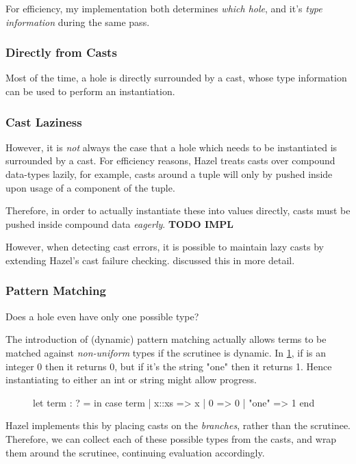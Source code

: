 For efficiency, my implementation both determines \textit{which hole}, and it's \textit{type information} during the same pass.

\subsubsection{Directly from Casts}
Most of the time, a hole is directly surrounded by a cast, whose type information can be used to perform an instantiation.

\subsubsection{Cast Laziness}\label{sec:CastLaziness}
However, it is \textit{not} always the case that a hole which needs to be instantiated is surrounded by a cast. For efficiency reasons, Hazel treats casts over compound data-types lazily, for example, casts around a tuple will only by pushed inside upon usage of a component of the tuple.

Therefore, in order to actually instantiate these into values directly, casts must be pushed inside compound data \textit{eagerly}. \textbf{TODO IMPL}

However, when detecting cast errors, it is possible to maintain lazy casts by extending Hazel's cast failure checking.  discussed this in more detail.


\subsubsection{Pattern Matching}
\label{sec:PatternMatching}
Does a hole even have only one possible type?

The introduction of (dynamic) pattern matching actually allows terms to be matched against \textit{non-uniform} types if the scrutinee is dynamic. In \cref{fig:DynamicPatternMatching}, if  is an integer 0 then it returns 0, but if it's the string "one" then it returns 1. Hence instantiating  to either an int or string might allow progress.

\begin{figure}[h]
let term : ? =   in
case term 
  | x::xs => x
  | 0 => 0
| "one" => 1 end 
\label{fig:DynamicPatternMatching}
\end{figure}

Hazel implements this by placing casts on the \textit{branches}, rather than the scrutinee. Therefore, we can collect each of these possible types from the casts, and wrap them around the scrutinee, continuing evaluation accordingly.


